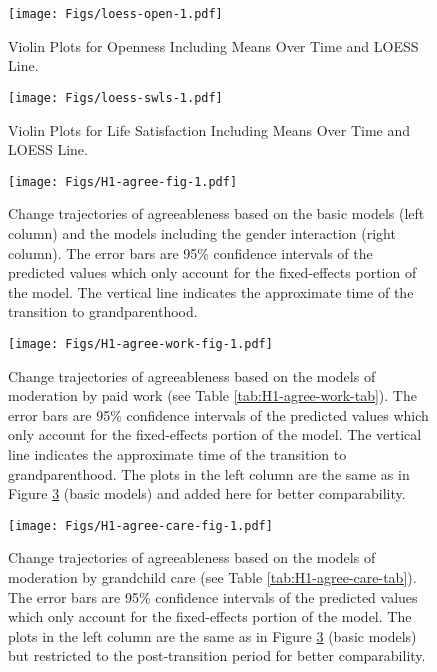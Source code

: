 \documentclass[
  english,
  man, noextraspace]{apa7}
\begin{document}
\begin{appendix}
\begin{figure}
\centering
\texttt{[image: Figs/loess-open-1.pdf]}
\caption{\label{fig:loess-open}Violin Plots for Openness Including Means Over Time
and LOESS Line.}
\end{figure}




\begin{figure}
\centering
\texttt{[image: Figs/loess-swls-1.pdf]}
\caption{\label{fig:loess-swls}Violin Plots for Life Satisfaction Including Means
Over Time and LOESS Line.}
\end{figure}








\begin{figure}
\centering
\texttt{[image: Figs/H1-agree-fig-1.pdf]}
\caption{\label{fig:H1-agree-fig}Change trajectories of agreeableness based on the
basic models (left column) and the models including the gender
interaction (right column). The error bars are 95\% confidence intervals
of the predicted values which only account for the fixed-effects portion
of the model. The vertical line indicates the approximate time of the
transition to grandparenthood.}
\end{figure}










\begin{figure}
\centering
\texttt{[image: Figs/H1-agree-work-fig-1.pdf]}
\caption{\label{fig:H1-agree-work-fig}Change trajectories of agreeableness based
on the models of moderation by paid work (see Table
\ref{tab:H1-agree-work-tab}). The error bars are 95\% confidence
intervals of the predicted values which only account for the
fixed-effects portion of the model. The vertical line indicates the
approximate time of the transition to grandparenthood. The plots in the
left column are the same as in Figure \ref{fig:H1-agree-fig} (basic
models) and added here for better comparability.}
\end{figure}









\begin{figure}
\centering
\texttt{[image: Figs/H1-agree-care-fig-1.pdf]}
\caption{\label{fig:H1-agree-care-fig}Change trajectories of agreeableness based
on the models of moderation by grandchild care (see Table
\ref{tab:H1-agree-care-tab}). The error bars are 95\% confidence
intervals of the predicted values which only account for the
fixed-effects portion of the model. The plots in the left column are the
same as in Figure \ref{fig:H1-agree-fig} (basic models) but restricted
to the post-transition period for better comparability.}
\end{figure}









\end{appendix}
\end{document}
